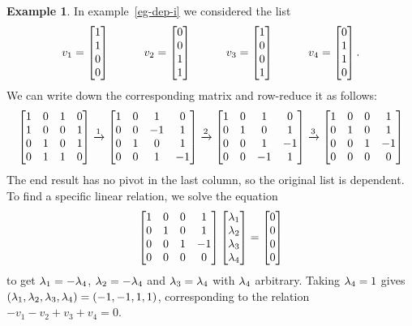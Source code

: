 \documentclass[reqno]{amsart}
\theoremstyle{definition}
\newtheorem{example}[theorem]{Example}
\begin{document}
\begin{example}\label{eg-dep-i-matrix}
 In example~\ref{eg-dep-i} we considered the list
 \[ v_1 = \left[\begin{matrix} 1 \\ 1 \\ 0 \\ 0 \end{matrix}\right] \hspace{3em}
    v_2 = \left[\begin{matrix} 0 \\ 0 \\ 1 \\ 1 \end{matrix}\right] \hspace{3em}
    v_3 = \left[\begin{matrix} 1 \\ 0 \\ 0 \\ 1 \end{matrix}\right] \hspace{3em}
    v_4 = \left[\begin{matrix} 0 \\ 1 \\ 1 \\ 0 \end{matrix}\right].
 \]
 We can write down the corresponding matrix and row-reduce it as
 follows:
 \[
  \left[\begin{matrix} 1 & 0 & 1 & 0 \\
       1 & 0 & 0 & 1 \\
       0 & 1 & 0 & 1 \\
       0 & 1 & 1 & 0
  \end{matrix}\right] \xrightarrow{1}
  \left[\begin{matrix} 1 & 0 & 1 & 0 \\
       0 & 0 &-1 & 1 \\
       0 & 1 & 0 & 1 \\
       0 & 0 & 1 &-1
  \end{matrix}\right] \xrightarrow{2}
  \left[\begin{matrix} 1 & 0 & 1 & 0 \\
       0 & 1 & 0 & 1 \\
       0 & 0 & 1 &-1 \\
       0 & 0 &-1 & 1
  \end{matrix}\right] \xrightarrow{3}
  \left[\begin{matrix} 1 & 0 & 0 & 1 \\
       0 & 1 & 0 & 1 \\
       0 & 0 & 1 &-1 \\
       0 & 0 & 0 & 0
  \end{matrix}\right]
 \]
 The end result has no pivot in the last column, so the original list is
 dependent.  To find a specific linear relation, we solve the equation
 \[   \left[\begin{matrix} 1 & 0 & 0 & 1 \\
           0 & 1 & 0 & 1 \\
           0 & 0 & 1 &-1 \\
           0 & 0 & 0 & 0
      \end{matrix}\right]
      \left[\begin{matrix} \lambda_1 \\ \lambda_2 \\ \lambda_3 \\ \lambda_4 \end{matrix}\right] =
      \left[\begin{matrix} 0 \\ 0 \\ 0 \\ 0 \end{matrix}\right]
 \]
 to get $\lambda_1=-\lambda_4$, $\lambda_2=-\lambda_4$ and $\lambda_3=\lambda_4$ with $\lambda_4$
 arbitrary.  Taking $\lambda_4=1$ gives
 $(\lambda_1,\lambda_2,\lambda_3,\lambda_4)=(-1,-1,1,1)$, corresponding to the
 relation $-v_1-v_2+v_3+v_4=0$.
\end{example}
\end{document}
